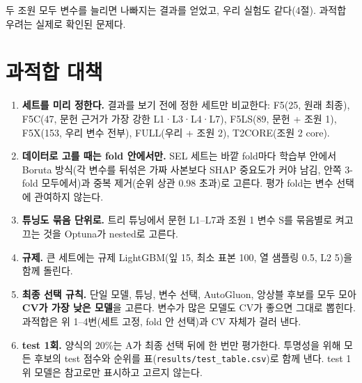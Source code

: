 \documentclass[10pt,a4paper]{article}
\newcommand{\col}[1]{\texttt{\small #1}}
\begin{document}
두 조원 모두 변수를 늘리면 나빠지는 결과를 얻었고, 우리 실험도 같다(4절). 과적합 우려는 실제로 확인된 문제다.

\section{과적합 대책}
\begin{enumerate}
\item \textbf{세트를 미리 정한다.} 결과를 보기 전에 정한 세트만 비교한다: F5(25, 원래 최종), F5C(47, 문헌 근거가 가장 강한 L1·L3·L4·L7), F5LS(89, 문헌 + 조원 1), F5X(153, 우리 변수 전부), FULL(우리 + 조원 2), T2CORE(조원 2 core).
\item \textbf{데이터로 고를 때는 fold 안에서만.} SEL 세트는 바깥 fold마다 학습부 안에서 Boruta 방식(각 변수를 뒤섞은 가짜 사본보다 SHAP 중요도가 커야 남김, 안쪽 3-fold 모두에서)과 중복 제거(순위 상관 0.98 초과)로 고른다. 평가 fold는 변수 선택에 관여하지 않는다.
\item \textbf{튜닝도 묶음 단위로.} 트리 튜닝에서 문헌 L1–L7과 조원 1 변수 S를 묶음별로 켜고 끄는 것을 Optuna가 nested로 고른다.
\item \textbf{규제.} 큰 세트에는 규제 LightGBM(잎 15, 최소 표본 100, 열 샘플링 0.5, L2 5)을 함께 돌린다.
\item \textbf{최종 선택 규칙.} 단일 모델, 튜닝, 변수 선택, AutoGluon, 앙상블 후보를 모두 모아 \textbf{CV가 가장 낮은 모델}을 고른다. 변수가 많은 모델도 CV가 좋으면 그대로 뽑힌다. 과적합은 위 1–4번(세트 고정, fold 안 선택)과 CV 자체가 걸러 낸다.
\item \textbf{test 1회.} 양식의 20\%는 A가 최종 선택 뒤에 한 번만 평가한다. 투명성을 위해 모든 후보의 test 점수와 순위를 표(\col{results/test\_table.csv})로 함께 낸다. test 1위 모델은 참고로만 표시하고 고르지 않는다.
\end{enumerate}

\end{document}
